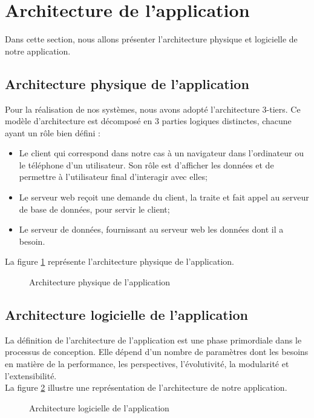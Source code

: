 \section{Architecture de l'application}
Dans cette section, nous allons présenter l'architecture physique et logicielle de notre application.
\subsection{Architecture physique de l'application}
Pour la réalisation de nos systèmes, nous avons adopté l'architecture 3-tiers. Ce modèle d'architecture est décomposé en 3 parties logiques distinctes, chacune ayant un rôle bien défini :
\begin{itemize}
    \item Le client qui correspond dans notre cas à un navigateur dans l’ordinateur ou le téléphone d’un utilisateur. Son rôle est d'afficher les données et de permettre à l'utilisateur final d'interagir avec elles;
    
    \item Le serveur web reçoit une demande du client, la traite et fait appel au serveur de base de données, pour servir le client;
    
      \item Le serveur de données, fournissant au serveur web les données dont il a besoin. 
   
   
    \end{itemize}
La figure \ref{fig:architecture_physique} représente l'architecture physique de l'application.
    \begin{figure}[htpb]
    \centering
    \caption{Architecture physique de l'application}
    \label{fig:architecture_physique}
    \end{figure}
\subsection{Architecture logicielle de l'application}
La définition de l'architecture de l'application est une phase primordiale dans le processus de conception. Elle dépend d'un nombre de paramètres dont les besoins en matière de
la performance, les perspectives, l'évolutivité, la modularité et l'extensibilité.\\
La figure \ref{fig:architecture de projet} illustre une
représentation de l'architecture de notre application.
\newpage
    \begin{figure}[htpb]
    \centering
    \caption{Architecture logicielle de l'application}
    \label{fig:architecture de projet}
    \end{figure}
   
